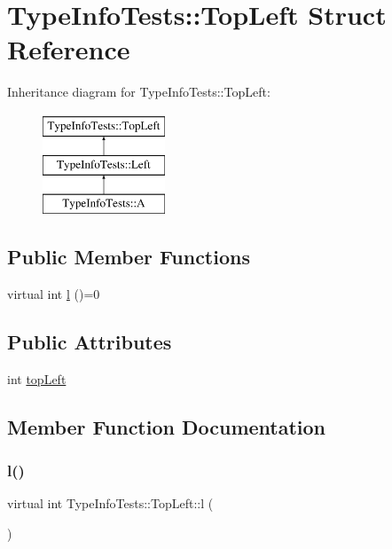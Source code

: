 \hypertarget{structTypeInfoTests_1_1TopLeft}{}\section{Type\+Info\+Tests\+::Top\+Left Struct Reference}
\label{structTypeInfoTests_1_1TopLeft}
Inheritance diagram for Type\+Info\+Tests\+::Top\+Left\+:\begin{figure}[H]
\begin{center}
\leavevmode
\includegraphics[height=3.000000cm]{structTypeInfoTests_1_1TopLeft}
\end{center}
\end{figure}
\subsection*{Public Member Functions}
\begin{DoxyCompactItemize}
\item 
virtual int \mbox{\hyperlink{structTypeInfoTests_1_1TopLeft_aa7b113c1f915b757c8e42cca99f6081d}{l}} ()=0
\end{DoxyCompactItemize}
\subsection*{Public Attributes}
\begin{DoxyCompactItemize}
\item 
int \mbox{\hyperlink{structTypeInfoTests_1_1TopLeft_a68d4ff27ddabdf320b8c0b64735888f7}{top\+Left}}
\end{DoxyCompactItemize}


\subsection{Member Function Documentation}
\mbox{\label{structTypeInfoTests_1_1TopLeft_aa7b113c1f915b757c8e42cca99f6081d}} 
\subsubsection{\texorpdfstring{l()}{l()}}
{\footnotesize\ttfamily virtual int Type\+Info\+Tests\+::\+Top\+Left\+::l (\begin{DoxyParamCaption}{ }\end{DoxyParamCaption})\hspace{0.3cm}{\ttfamily [pure virtual]}}



